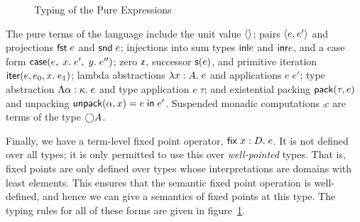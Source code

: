 \begin{figure}
\caption{Typing of the Pure Expressions}
\label{lang-typing-pure}
\end{figure}

The pure terms of the language include the unit value $\left<\right>$; pairs
$\left<{e},{e'}\right>$ and projections $\mathsf{fst}\; e$ and $\mathsf{snd}\; e$; injections
into sum types $\mathsf{inl }e$ and $\mathsf{inr }e$, and a case form
$\mathsf{case}(e,\; {x}.\; e',\; {y}.\; e'')$; zero $\mathsf{z}$, successor $\mathsf{s}(e)$, and primitive
iteration $\mathsf{iter}(e, {e_0}, {x}.\; {e_1})$; lambda abstractions $\lambda x:A.\;e$
and applications $e\;e'$; type abstraction $\Lambda \alpha:\kappa.\;e$
and type application $e\;\tau$; and existential packing
$\mathsf{pack}({\tau}, {e})$ and unpacking $\mathsf{unpack}({\alpha}, {x}) = {e} \;\mathsf{in}\;{e'}$. Suspended
monadic computations $\comp{c}$ are terms of the type $\bigcirc{A}$.

Finally, we have a term-level fixed point operator, $\mathsf{fix}\;{x:D}.\;{e}$. It
is not defined over all types; it is only permitted to use this over
\emph{well-pointed} types. That is, fixed points are only defined over
types whose interpretations are domains with least elements. This
ensures that the semantic fixed point operation is well-defined, and
hence we can give a semantics of fixed points at this type. The typing
rules for all of these forms are given in figure~\ref{lang-typing-pure}. 


